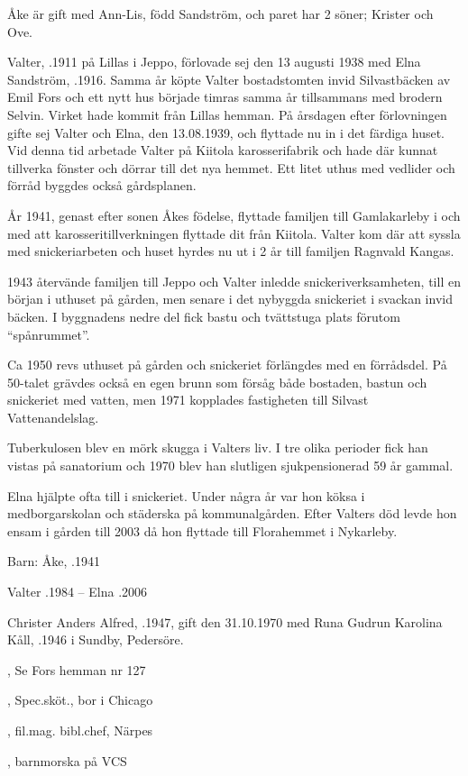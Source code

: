 Åke är gift med Ann-Lis, född Sandström, och paret har 2 söner;	Krister och Ove.



Valter, .1911 på Lillas i Jeppo, förlovade sej den 13 augusti 1938 med Elna Sandström, .1916. Samma år
köpte Valter bostadstomten invid Silvastbäcken av Emil Fors och ett nytt hus började timras samma år tillsammans med brodern Selvin. Virket hade kommit från Lillas hemman. På årsdagen efter förlovningen gifte sej Valter och Elna, den 13.08.1939, och flyttade nu in i det färdiga huset. Vid denna tid arbetade Valter på Kiitola karosserifabrik och hade där kunnat tillverka fönster och dörrar till det nya hemmet. Ett litet uthus med vedlider och förråd byggdes också gårdsplanen.

År 1941, genast efter sonen Åkes födelse, flyttade familjen till Gamlakarleby i och med att karosseritillverkningen flyttade dit från Kiitola. Valter kom där att syssla med snickeriarbeten och huset hyrdes nu ut i 2 år till familjen Ragnvald Kangas.

1943 återvände familjen till Jeppo och Valter inledde snickeriverksamheten, till en början i uthuset på gården, men senare i det nybyggda snickeriet i svackan invid bäcken. I byggnadens nedre del fick bastu och tvättstuga plats förutom ``spånrummet''.

Ca 1950 revs uthuset på gården och snickeriet förlängdes med en förrådsdel. På 50-talet grävdes också en egen brunn som försåg både bostaden, bastun och snickeriet med vatten, men 1971 kopplades fastigheten till Silvast Vattenandelslag.

Tuberkulosen blev en mörk skugga i Valters liv. I tre olika perioder fick han vistas på sanatorium och 1970 blev han slutligen sjukpensionerad 59 år gammal.

Elna hjälpte ofta till i snickeriet. Under några år var hon köksa i medborgarskolan och städerska på kommunalgården. Efter Valters död levde hon ensam i gården till 2003 då hon flyttade till Florahemmet i Nykarleby.

Barn: Åke, .1941

Valter .1984  --  Elna .2006






Christer Anders Alfred, .1947, gift den 31.10.1970 med Runa Gudrun Karolina Kåll, .1946 i Sundby, Pedersöre.
\begin{jhchildren}
  \item {}, Se Fors hemman nr 127
  \item {}, Spec.sköt., bor i Chicago
  \item {}, fil.mag. bibl.chef, Närpes
  \item {}, barnmorska på VCS
\end{jhchildren}


